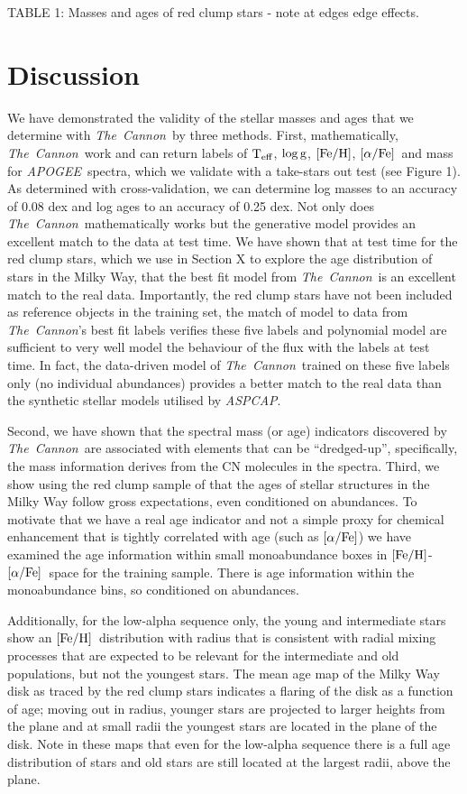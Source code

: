 \documentclass[12pt, preprint]{aastex}
\newcommand{\project}[1]{\textsl{#1}}
\newcommand{\tc}{\project{The~Cannon}}
\newcommand{\apogee}{\project{APOGEE}}
\newcommand{\aspcap}{\project{ASPCAP}}
\newcommand{\teff}{\mbox{$\rm T_{eff}$}}
\newcommand{\feh}{\mbox{$\rm [Fe/H]$}}
\newcommand{\alphafe}{\mbox{$\rm [\alpha/Fe]$}}
\newcommand{\logg}{\mbox{$\rm \log g$}}
\begin{document}
TABLE 1: Masses and ages of red clump stars - note at edges edge effects. 

\section{Discussion}

We have demonstrated the validity of the stellar masses and ages that we determine with \tc\ by three methods. First, mathematically, \tc\ work and can return labels of \teff, \logg, \feh, \alphafe\ and mass for \apogee\ spectra, which we validate with a take-stars out test (see Figure 1). As determined with cross-validation, we can determine log masses to an accuracy of 0.08 dex and log ages to an accuracy of 0.25 dex. Not only does \tc\ mathematically works but the generative model provides an excellent match to the data at test time. We have shown that at test time for the red clump stars, which we use in Section X to explore the age distribution of stars in the Milky Way, that the best fit model from \tc\ is an excellent match to the real data. Importantly, the red clump stars have not been included as reference objects in the training set, the match of model to data from \tc's best fit labels verifies these five labels and polynomial model are sufficient to very well model the behaviour of the flux with the labels at test time.  In fact, the data-driven model of \tc\ trained on these five labels only (no individual abundances) provides a better match to the real data than the synthetic stellar models utilised by \aspcap.

Second, we have shown that the spectral mass (or age) indicators discovered by \tc\ are associated with elements that can be ``dredged-up'', specifically, the mass information derives from the CN molecules in the spectra. Third, we show using the red clump sample of \citet{Bovy2014} that the ages of stellar structures in the Milky Way follow gross expectations, even conditioned on abundances. To motivate that we have a real age indicator and not a simple proxy for chemical enhancement that is tightly correlated with age (such as \alphafe) we have examined the age information within small monoabundance boxes in \feh-\alphafe\ space for the training sample. There is age information within the monoabundance bins, so conditioned on abundances. 

Additionally, for the low-alpha sequence only, the young and intermediate stars show an \feh\ distribution with radius that is consistent with radial mixing processes that are expected to be relevant for the intermediate and old populations, but not the youngest stars.  The mean age map of the Milky Way disk as traced by the red clump stars indicates a flaring of the disk as a function of age; moving out in radius, younger stars are projected to larger heights from the plane and at small radii the youngest stars are located in the plane of the disk. Note in these maps that even for the low-alpha sequence there is a full age distribution of stars and old stars are still located at the largest radii, above the plane. 
\end{document}
